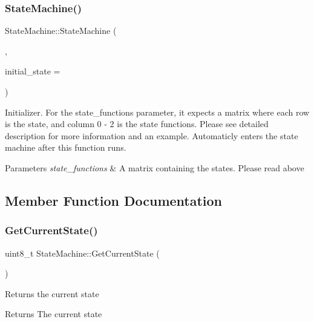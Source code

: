 \subsubsection{\texorpdfstring{State\+Machine()}{StateMachine()}}
{\footnotesize\ttfamily State\+Machine\+::\+State\+Machine (\begin{DoxyParamCaption}\item[{void($\ast$($\ast$\hyperlink{class_state_machine_acc87359cd98c436f5b891ffe6cb67160}{state\+\_\+functions}))(void)}]{,  }\item[{uint8\+\_\+t}]{initial\+\_\+state = {} }\end{DoxyParamCaption})\hspace{0.3cm}{\ttfamily [inline]}}

Initializer. For the state\+\_\+functions parameter, it expects a matrix where each row is the state, and column 0 -\/ 2 is the state functions. Please see detailed description for more information and an example. Automaticly enters the state machine after this function runs. 
\begin{DoxyParams}{Parameters}
{\em state\+\_\+functions} & A matrix containing the states. Please read above \\
\hline
\end{DoxyParams}


\subsection{Member Function Documentation}
\hypertarget{class_state_machine_a62fd24666d16a2425c8397ce2d326dae}{}\label{class_state_machine_a62fd24666d16a2425c8397ce2d326dae} 
\subsubsection{\texorpdfstring{Get\+Current\+State()}{GetCurrentState()}}
{\footnotesize\ttfamily uint8\+\_\+t State\+Machine\+::\+Get\+Current\+State (\begin{DoxyParamCaption}{ }\end{DoxyParamCaption})}

Returns the current state \begin{DoxyReturn}{Returns}
The current state 
\end{DoxyReturn}
\hypertarget{class_state_machine_a94c93f8203bab4f5a3784eba7445b582}{}\label{class_state_machine_a94c93f8203bab4f5a3784eba7445b582} 
